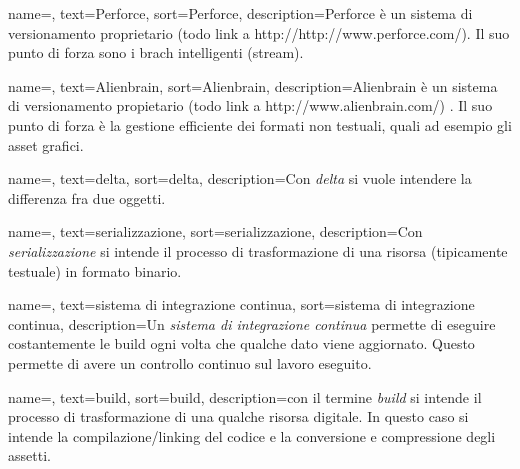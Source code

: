 {
	name=,
	text=Perforce,
	sort=Perforce,
	description={Perforce è un sistema di versionamento proprietario (todo link a http://http://www.perforce.com/). Il suo punto di forza sono i brach intelligenti (stream).}
}

{
	name=,
	text=Alienbrain,
	sort=Alienbrain,
	description={Alienbrain è un sistema di versionamento propietario (todo link a http://www.alienbrain.com/) . Il suo punto di forza è la gestione efficiente dei formati non testuali, quali ad esempio gli asset grafici.}
}

{
	name=,
	text=delta,
	sort=delta,
	description={Con \emph{delta} si vuole intendere la differenza fra due oggetti.}
}

{
	name=,
	text=serializzazione,
	sort=serializzazione,
	description={Con \emph{serializzazione} si intende il processo di trasformazione di una risorsa (tipicamente testuale) in formato binario.}
}

{
	name=,
	text=sistema di integrazione continua,
	sort=sistema di integrazione continua,
	description={Un \emph{sistema di integrazione continua} permette di eseguire costantemente le build ogni volta che qualche dato viene aggiornato. Questo permette di avere un controllo continuo sul lavoro eseguito.}
}

{
	name=,
	text=build,
	sort=build,
	description={con il termine \emph{build} si intende il processo di trasformazione di una qualche risorsa digitale. In questo caso si intende la compilazione/linking del codice e la conversione e compressione degli assetti.}
}
